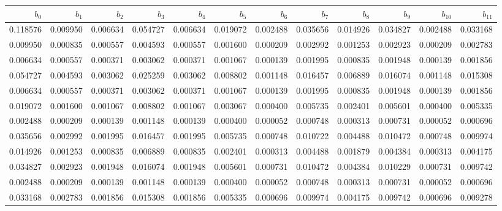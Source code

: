 \begin{tabular}{rrrrrrrrrrrr}
\toprule
$b_0$ & $b_1$ & $b_2$ & $b_3$ & $b_4$ & $b_5$ & $b_6$ & $b_7$ & $b_8$ & $b_9$ & $b_10$ & $b_11$ \\
\midrule
0.118576 & 0.009950 & 0.006634 & 0.054727 & 0.006634 & 0.019072 & 0.002488 & 0.035656 & 0.014926 & 0.034827 & 0.002488 & 0.033168 \\
0.009950 & 0.000835 & 0.000557 & 0.004593 & 0.000557 & 0.001600 & 0.000209 & 0.002992 & 0.001253 & 0.002923 & 0.000209 & 0.002783 \\
0.006634 & 0.000557 & 0.000371 & 0.003062 & 0.000371 & 0.001067 & 0.000139 & 0.001995 & 0.000835 & 0.001948 & 0.000139 & 0.001856 \\
0.054727 & 0.004593 & 0.003062 & 0.025259 & 0.003062 & 0.008802 & 0.001148 & 0.016457 & 0.006889 & 0.016074 & 0.001148 & 0.015308 \\
0.006634 & 0.000557 & 0.000371 & 0.003062 & 0.000371 & 0.001067 & 0.000139 & 0.001995 & 0.000835 & 0.001948 & 0.000139 & 0.001856 \\
0.019072 & 0.001600 & 0.001067 & 0.008802 & 0.001067 & 0.003067 & 0.000400 & 0.005735 & 0.002401 & 0.005601 & 0.000400 & 0.005335 \\
0.002488 & 0.000209 & 0.000139 & 0.001148 & 0.000139 & 0.000400 & 0.000052 & 0.000748 & 0.000313 & 0.000731 & 0.000052 & 0.000696 \\
0.035656 & 0.002992 & 0.001995 & 0.016457 & 0.001995 & 0.005735 & 0.000748 & 0.010722 & 0.004488 & 0.010472 & 0.000748 & 0.009974 \\
0.014926 & 0.001253 & 0.000835 & 0.006889 & 0.000835 & 0.002401 & 0.000313 & 0.004488 & 0.001879 & 0.004384 & 0.000313 & 0.004175 \\
0.034827 & 0.002923 & 0.001948 & 0.016074 & 0.001948 & 0.005601 & 0.000731 & 0.010472 & 0.004384 & 0.010229 & 0.000731 & 0.009742 \\
0.002488 & 0.000209 & 0.000139 & 0.001148 & 0.000139 & 0.000400 & 0.000052 & 0.000748 & 0.000313 & 0.000731 & 0.000052 & 0.000696 \\
0.033168 & 0.002783 & 0.001856 & 0.015308 & 0.001856 & 0.005335 & 0.000696 & 0.009974 & 0.004175 & 0.009742 & 0.000696 & 0.009278 \\
\bottomrule
\end{tabular}
